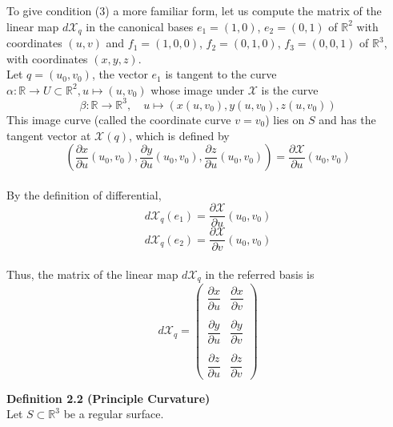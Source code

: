 \documentclass{article}
\begin{document}
\par
To give condition (3) a more familiar form, let us compute the matrix of the linear map $d\mathcal{X}_q$ in the
canonical bases $e_1 = (1,0)$, $e_2 = (0,1)$ of $\mathbb{R}^2$ with coordinates $(u,v)$ and
$f_1 = (1,0,0)$, $f_2 = (0,1,0)$, $f_3 = (0,0,1)$ of $\mathbb{R}^3$, with coordinates $(x,y,z)$.\\
Let $q = (u_0, v_0)$, the vector $e_1$ is tangent to the curve $\alpha: \mathbb{R} \to U \subset \mathbb{R}^2, u \mapsto (u,v_0)$
whose image under $\mathcal{X}$ is
the curve
$$
    \beta: \mathbb{R} \to \mathbb{R}^3, \quad u \mapsto (x(u, v_0), y(u, v_0), z(u, v_0))
$$
This image curve (called the coordinate curve $v = v_0$) lies on $S$ and has the tangent vector at $\mathcal{X}(q)$,
which is defined by
$$
    (\frac{\partial x}{\partial u}(u_0,v_0), \frac{\partial y}{\partial u}(u_0,v_0), \frac{\partial z}{\partial u}(u_0,v_0)) = \frac{\partial \mathcal{X}}{\partial u}(u_0,v_0)
$$\\
By the definition of differential,
$$
    d\mathcal{X}_q(e_1) = \frac{\partial \mathcal{X}}{\partial u}(u_0, v_0)
$$
$$
    d\mathcal{X}_q(e_2) = \frac{\partial \mathcal{X}}{\partial v}(u_0, v_0)
$$\\
Thus, the matrix of the linear map $d\mathcal{X}_q$ in the referred basis is
$$
    d\mathcal{X}_q = 
    \left(\begin{array}{cc} 
        \dfrac{\partial x}{\partial u} & \dfrac{\partial x}{\partial v} \\\\
        \dfrac{\partial y}{\partial u} & \dfrac{\partial y}{\partial v} \\\\
        \dfrac{\partial z}{\partial u} & \dfrac{\partial z}{\partial v}
    \end{array}\right)
$$


\par
\textbf{Definition 2.2 (Principle Curvature)}\\
Let $S \subset \mathbb R^3$ be a regular surface.
\end{document}
